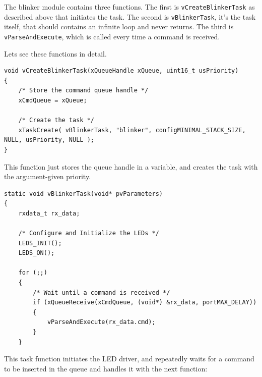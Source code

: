 \documentclass[11pt]{report}
\begin{document}
The blinker module contains three functions. The first is \verb$vCreateBlinkerTask$ as described above that initiates the task. The second is \verb$vBlinkerTask$, it's the task itself, that should contains an infinite loop and never returns. The third is \verb$vParseAndExecute$, which is called every time a command is received.

Lets see these functions in detail.

\begin{verbatim}
void vCreateBlinkerTask(xQueueHandle xQueue, uint16_t usPriority)
{
    /* Store the command queue handle */
    xCmdQueue = xQueue;
    
    /* Create the task */
    xTaskCreate( vBlinkerTask, "blinker", configMINIMAL_STACK_SIZE, NULL, usPriority, NULL );
}
\end{verbatim}
This function just stores the queue handle in a variable, and creates the task with the argument-given priority.

\begin{verbatim}
static void vBlinkerTask(void* pvParameters)
{
    rxdata_t rx_data;
    
    /* Configure and Initialize the LEDs */
    LEDS_INIT();
    LEDS_ON();
    
    for (;;)
    {
        /* Wait until a command is received */
        if (xQueueReceive(xCmdQueue, (void*) &rx_data, portMAX_DELAY))
        {
            vParseAndExecute(rx_data.cmd);
        }
    }
\end{verbatim}

This task function initiates the LED driver, and repeatedly waits for a command to be inserted in the queue and handles it with the next function:
\end{document}

